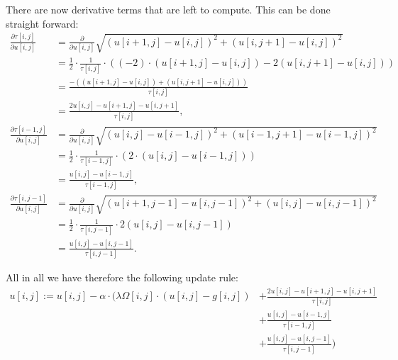 \documentclass{paper}
\begin{document}
There are now derivative terms that are left to compute. This can be done straight forward:
\begin{align*}
\frac{\partial \tau[i,j]}{\partial u[i,j]} &= \frac{\partial}{\partial u[i,j]} \sqrt{(u[i+1,j] - u[i,j])^2 + (u[i,j+1] - u[i,j])^2} \\
&= \frac{1}{2} \cdot \frac{1}{\tau[i,j]} \cdot \left((-2) \cdot (u[i+1,j] - u[i,j]) -2 (u[i,j+1] - u[i,j])\right) \\
&= \frac{- ((u[i+1,j] - u[i,j]) + (u[i,j+1] - u[i,j]))}{\tau[i,j]} \\
&= \frac{2 u[i,j] - u[i+1,j] - u[i,j+1]}{\tau[i,j]}, \\
\frac{\partial \tau[i-1,j]}{\partial u[i,j]} &= \frac{\partial}{\partial u[i,j]} \sqrt{(u[i,j] - u[i-1,j])^2 + (u[i-1,j+1] - u[i-1,j])^2} \\
&= \frac{1}{2} \cdot \frac{1}{\tau[i-1,j]} \cdot \left( 2 \cdot (u[i,j] - u[i-1,j]) \right) \\
&= \frac{u[i,j]-u[i-1,j]}{\tau[i-1,j]}, \\
\frac{\partial \tau[i,j-1]}{\partial u[i,j]} &= \frac{\partial}{\partial u[i,j]} \sqrt{(u[i+1,j-1] - u[i,j-1])^2 + (u[i,j] - u[i,j-1])^2} \\
&= \frac{1}{2} \cdot \frac{1}{\tau[i,j-1]} \cdot 2 (u[i,j] - u[i,j-1]) \\
&= \frac{u[i,j] - u[i,j-1]}{\tau[i,j-1]}.
\end{align*}

All in all we have therefore the following update rule:
\begin{equation}
\begin{aligned}
  u[i,j] := u[i,j] - \alpha \cdot \Bigg( \lambda \Omega[i,j] \cdot (u[i,j]-g[i,j]) &+ \frac{2 u[i,j] - u[i+1,j] - u[i,j+1]}{\tau[i,j]} \\ 
  &+ \frac{u[i,j]-u[i-1,j]}{\tau[i-1,j]} \\ 
  &+ \frac{u[i,j] - u[i,j-1]}{\tau[i,j-1]}\Bigg)
\end{aligned}
\label{eq:update-final}
\end{equation}
\end{document}
